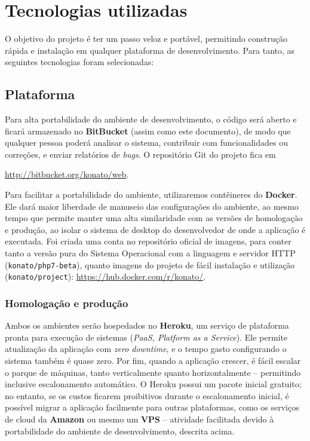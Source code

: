 \documentclass[12pt,a4paper,twoside,hyphens,english,brazil]{abntex2}
\begin{document}
\section{Tecnologias utilizadas} \label{sec:tecnologias}

O objetivo do projeto é ter um passo veloz e portável, permitindo construção rápida e instalação em qualquer plataforma de desenvolvimento. Para tanto, as seguintes tecnologias foram selecionadas:

\subsection{Plataforma}
Para alta portabilidade do ambiente de desenvolvimento, o código será aberto e ficará armazenado no \textbf{BitBucket} (assim como este documento), de modo que qualquer pessoa poderá analisar o sistema, contribuir com funcionalidades ou correções, e enviar relatórios de \textit{bugs}. O repositório Git do projeto fica em {\url{http://bitbucket.org/konato/web}.

Para facilitar a portabilidade do ambiente, utilizaremos contêineres do \textbf{Docker}\footnotemark. Ele dará maior liberdade de manuseio das configurações do ambiente, ao mesmo tempo que permite manter uma alta similaridade com as versões de homologação e produção, ao isolar o sistema de desktop do desenvolvedor de onde a aplicação é executada.\cite{docker-presentation} Foi criada uma conta no repositório oficial de imagens, para conter tanto a versão pura do Sistema Operacional com a linguagem e servidor HTTP (\texttt{konato/php7-beta}), quanto imagens do projeto de fácil instalação e utilização (\texttt{konato/project}): \url{https://hub.docker.com/r/konato/}.

\subsubsection*{Homologação e produção}
Ambos os ambientes serão hospedados no \textbf{Heroku}, um serviço de plataforma pronta para execução de sistemas (\textit{PaaS, Platform as a Service}). Ele permite atualização da aplicação com \textit{zero downtime}, e o tempo gasto configurando o sistema também é quase zero. Por fim, quando a aplicação crescer, é fácil escalar o parque de máquinas, tanto verticalmente quanto horizontalmente -- permitindo inclusive escalonamento automático. %
O Heroku possui um pacote inicial gratuito; no entanto, se os custos ficarem proibitivos durante o escalonamento inicial, é possível migrar a aplicação facilmente para outras plataformas, como os serviços de cloud da \textbf{Amazon} ou mesmo um \textbf{VPS} -- atividade facilitada devido à portabilidade do ambiente de desenvolvimento, descrita acima.

}
\end{document}
